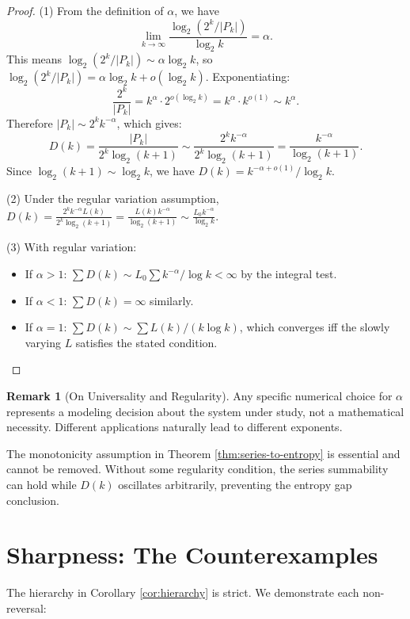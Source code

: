 \documentclass[11pt]{article}
\theoremstyle{definition}
\newtheorem{remark}[theorem]{Remark}
\begin{document}
\begin{proof}
(1) From the definition of $\alpha$, we have
$$\lim_{k \to \infty} \frac{\log_2(2^k/|P_k|)}{\log_2 k} = \alpha.$$
This means $\log_2(2^k/|P_k|) \sim \alpha \log_2 k$, so $\log_2(2^k/|P_k|) = \alpha \log_2 k + o(\log_2 k)$. Exponentiating:
$$\frac{2^k}{|P_k|} = k^\alpha \cdot 2^{o(\log_2 k)} = k^\alpha \cdot k^{o(1)} \sim k^\alpha.$$
Therefore $|P_k| \sim 2^k k^{-\alpha}$, which gives:
$$D(k) = \frac{|P_k|}{2^k \log_2(k+1)} \sim \frac{2^k k^{-\alpha}}{2^k \log_2(k+1)} = \frac{k^{-\alpha}}{\log_2(k+1)}.$$
Since $\log_2(k+1) \sim \log_2 k$, we have $D(k) = k^{-\alpha+o(1)}/\log_2 k$.

(2) Under the regular variation assumption, $D(k) = \frac{2^k k^{-\alpha} L(k)}{2^k \log_2(k+1)} = \frac{L(k) k^{-\alpha}}{\log_2(k+1)} \sim \frac{L_0 k^{-\alpha}}{\log_2 k}$.

(3) With regular variation:
\begin{itemize}
\item If $\alpha > 1$: $\sum D(k) \sim L_0 \sum k^{-\alpha}/\log k < \infty$ by the integral test.
\item If $\alpha < 1$: $\sum D(k) = \infty$ similarly.
\item If $\alpha = 1$: $\sum D(k) \sim \sum L(k)/(k\log k)$, which converges iff the slowly varying $L$ satisfies the stated condition.
\end{itemize}
\end{proof}

\begin{remark}[On Universality and Regularity]\label{rem:universality}
Any specific numerical choice for $\alpha$ represents a modeling decision about the system under study, not a mathematical necessity. Different applications naturally lead to different exponents.

The monotonicity assumption in Theorem \ref{thm:series-to-entropy} is essential and cannot be removed. Without some regularity condition, the series summability can hold while $D(k)$ oscillates arbitrarily, preventing the entropy gap conclusion.
\end{remark}

\section{Sharpness: The Counterexamples}

The hierarchy in Corollary \ref{cor:hierarchy} is strict. We demonstrate each non-reversal:
\end{document}
